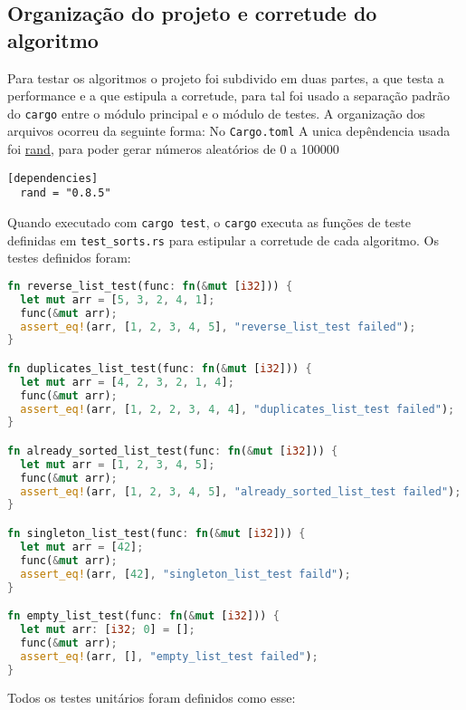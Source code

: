 \subsection{Organização do projeto e corretude do algoritmo}

Para testar os algoritmos o projeto foi subdivido em duas partes, a que testa a performance e a que estipula a corretude, para tal foi usado a separação padrão do \texttt{cargo} entre o módulo principal e o módulo de testes. A organização dos arquivos ocorreu da seguinte forma:
\vspace{1em}
\FloatBarrier
\vspace{1em}
\noindent
No \texttt{Cargo.toml} A unica depêndencia usada foi \href{https://docs.rs/rand/latest/rand/}{rand}, para poder gerar números aleatórios de 0 a 100000
\begin{lstlisting}[caption={Trecho do \texttt{Cargo.toml}}]
  [dependencies]
  rand = "0.8.5"
\end{lstlisting}
\FloatBarrier
\noindent
Quando executado com \texttt{cargo test}, o \texttt{cargo} executa as funções de teste definidas em \texttt{test\_sorts.rs} para estipular a corretude de cada algoritmo. Os testes definidos foram:

\begin{lstlisting}[language=Rust, caption={Trecho de \texttt{test\_sorts.rs}}]
fn reverse_list_test(func: fn(&mut [i32])) {
  let mut arr = [5, 3, 2, 4, 1];
  func(&mut arr);
  assert_eq!(arr, [1, 2, 3, 4, 5], "reverse_list_test failed");
}

fn duplicates_list_test(func: fn(&mut [i32])) {
  let mut arr = [4, 2, 3, 2, 1, 4];
  func(&mut arr);
  assert_eq!(arr, [1, 2, 2, 3, 4, 4], "duplicates_list_test failed");
}

fn already_sorted_list_test(func: fn(&mut [i32])) {
  let mut arr = [1, 2, 3, 4, 5];
  func(&mut arr);
  assert_eq!(arr, [1, 2, 3, 4, 5], "already_sorted_list_test failed");
}

fn singleton_list_test(func: fn(&mut [i32])) {
  let mut arr = [42];
  func(&mut arr);
  assert_eq!(arr, [42], "singleton_list_test faild");
}

fn empty_list_test(func: fn(&mut [i32])) {
  let mut arr: [i32; 0] = [];
  func(&mut arr);
  assert_eq!(arr, [], "empty_list_test failed");
}
\end{lstlisting}
\FloatBarrier
\noindent
Todos os testes unitários foram definidos como esse:

